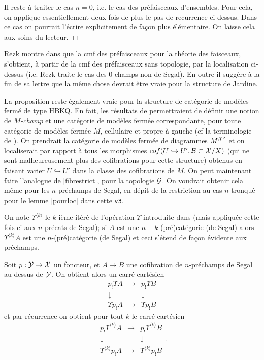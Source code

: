 \documentclass[12pt]{article}
\newcommand{\eop}{\hfill $\Box$\vspace{.1in}}
\newcommand{\Gg}{{\cal G}}
\newcommand{\Bb}{{\cal B}}
\newcommand{\Xx}{{\cal X}}
\newcommand{\Yy}{{\cal Y}}
\begin{document}
Il reste \`a traiter le cas $n=0$, i.e. le cas des pr\'efaisceaux d'ensembles.
Pour cela, on applique essentiellement deux fois de plus le pas de recurrence
ci-dessus. Dans ce cas on pourrait l'\'ecrire explicitement de fa\c{c}on plus
\'el\'ementaire. On laisse cela aux soins du lecteur.
\eop


Rezk montre dans \cite{Rezk} que
la cmf des pr\'efaisceaux pour la th\'eorie des faisceaux, s'obtient,
\`a partir de la cmf
des pr\'efaisceaux sans topologie, par la localisation ci-dessus
(i.e. Rezk traite le cas des $0$-champs non de Segal). En outre il sugg\`ere
\`a la fin de sa lettre que la m\^eme chose devrait \^etre vraie pour la
structure de Jardine.

La proposition reste \'egalement vraie pour la structure de cat\'egorie de
mod\`eles ferm\'e de type HBKQ. En fait, les r\'esultats de
\cite{Hirschhorn} permettraient de d\'efinir une notion de {\em $M$-champ}
et une
cat\'egorie de mod\`eles ferm\'ee correspondante, pour toute cat\'egorie de
mod\`eles ferm\'ee $M$, cellulaire et propre \`a gauche (cf la terminologie de
\cite{Hirschhorn}). On prendrait la cat\'egorie de mod\`eles ferm\'ee de
diagrammes $M^{\Xx ^o}$ et on localiserait par rapport \`a tous les morphismes
$cof(U\hookrightarrow U', \Bb \subset \Xx /X)$ (qui ne sont malheureusement plus
des cofibrations pour cette structure) obtenus en faisant varier
$U\hookrightarrow U'$ dans la classe des
cofibrations de $M$.
On peut maintenant faire l'analogue de
\ref{fibrestrict}, pour la
topologie $\Gg$.
On voudrait obtenir cela m\^eme pour les $n$-pr\'echamps de Segal,
en d\'epit de la restriction au cas $n$-tronqu\'e pour le lemme
\ref{pourloc} dans cette {\tt v3}. 

On note $\Upsilon ^{\langle k \rangle }$ le 
$k$-i\`eme it\'er\'e de l'op\'eration $\Upsilon$ introduite dans
\cite{limits} (mais appliqu\'ee cette fois-ci aux $n$-pr\'ecats de Segal); 
si $A$ est une $n-k$-(pr\'e)cat\'egorie
(de Segal) alors $\Upsilon ^{\langle k\rangle } A$ est une $n$-(pr\'e)cat\'egorie
(de Segal) et ceci s'\'etend de fa\c{c}on \'evidente aux pr\'echamps. 

Soit $p: \Yy \rightarrow \Xx$ un foncteur, et $A\rightarrow B$ une cofibration
de $n$-pr\'echamps de Segal au-dessus de $\Yy$. On obtient alors un carr\'e
cart\'esien
$$
\begin{array}{ccc}
p_!\Upsilon A & \rightarrow & p_!\Upsilon B \\
\downarrow && \downarrow \\
\Upsilon p_!A & \rightarrow & \Upsilon p_!B
\end{array}
$$
et par r\'ecurrence on obtient pour tout $k$ le carr\'e cart\'esien
$$
\begin{array}{ccc}
p_!\Upsilon ^{\langle k \rangle }
A & \rightarrow & p_!\Upsilon ^{\langle k \rangle }B \\
\downarrow && \downarrow \\
\Upsilon ^{\langle k \rangle }p_!A & \rightarrow 
& \Upsilon ^{\langle k \rangle } p_!B
\end{array} .
$$
\end{document}
